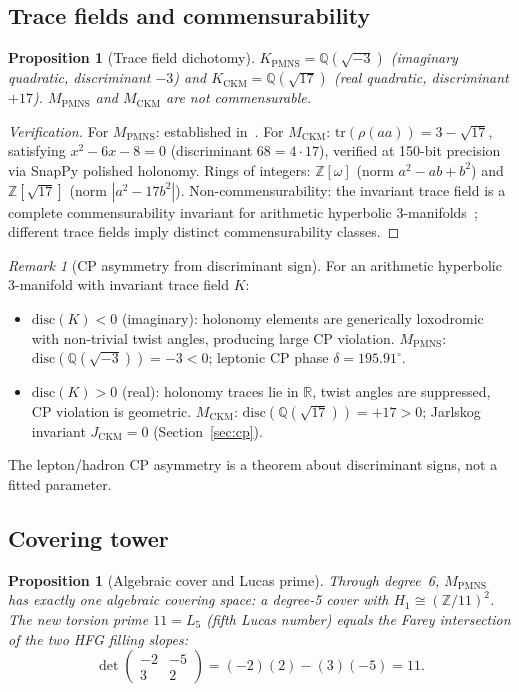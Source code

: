 \documentclass[11pt,a4paper]{article}
\newtheorem{proposition}[theorem]{Proposition}
\theoremstyle{definition}
\theoremstyle{remark}
\newtheorem{remark}[theorem]{Remark}
\newcommand{\ZZ}{\mathbb{Z}}
\newcommand{\QQ}{\mathbb{Q}}
\newcommand{\MPMNS}{M_{\mathrm{PMNS}}}
\newcommand{\MCKM}{M_{\mathrm{CKM}}}
\newcommand{\KPMNS}{K_{\mathrm{PMNS}}}
\newcommand{\KCKM}{K_{\mathrm{CKM}}}
\newcommand{\Zom}{\mathbb{Z}[\omega]}
\newcommand{\Zsev}{\mathbb{Z}[\sqrt{17}]}
\begin{document}
\subsection{Trace fields and commensurability}

\begin{proposition}[Trace field dichotomy]
\label{prop:tracefields}
$\KPMNS = \QQ(\sqrt{-3})$ (imaginary quadratic,
discriminant $-3$) and $\KCKM = \QQ(\sqrt{17})$
(real quadratic, discriminant $+17$).
$\MPMNS$ and $\MCKM$ are not commensurable.
\end{proposition}

\begin{proof}[Verification]
For $\MPMNS$: established in~\cite{Chinburg98}.
For $\MCKM$: $\mathrm{tr}(\rho(aa)) = 3-\sqrt{17}$,
satisfying $x^2-6x-8=0$ (discriminant $68=4\cdot17$),
verified at 150-bit precision via SnapPy polished holonomy.
Rings of integers: $\Zom$ (norm $a^2-ab+b^2$) and
$\Zsev$ (norm $|a^2-17b^2|$).
Non-commensurability: the invariant trace field is a complete
commensurability invariant for arithmetic hyperbolic
3-manifolds~\cite{MaclachlanReid}; different trace fields
imply distinct commensurability classes.
\end{proof}

\begin{remark}[CP asymmetry from discriminant sign]
\label{rem:cp_asym}
For an arithmetic hyperbolic 3-manifold with invariant trace field $K$:
\begin{itemize}
\item $\mathrm{disc}(K)<0$ (imaginary): holonomy elements are
  generically loxodromic with non-trivial twist angles,
  producing large CP violation.
  $\MPMNS$: $\mathrm{disc}(\QQ(\sqrt{-3}))=-3<0$;
  leptonic CP phase $\delta=195.91^\circ$.
\item $\mathrm{disc}(K)>0$ (real): holonomy traces lie in $\mathbb{R}$,
  twist angles are suppressed, CP violation is geometric.
  $\MCKM$: $\mathrm{disc}(\QQ(\sqrt{17}))=+17>0$;
  Jarlskog invariant $J_\mathrm{CKM}=0$ (Section~\ref{sec:cp}).
\end{itemize}
The lepton/hadron CP asymmetry is a theorem about discriminant signs,
not a fitted parameter.
\end{remark}

\subsection{Covering tower}

\begin{proposition}[Algebraic cover and Lucas prime]
\label{prop:cover}
Through degree~6, $\MPMNS$ has exactly one algebraic covering space:
a degree-5 cover with $H_1 \cong (\ZZ/11)^2$.
The new torsion prime $11 = L_5$ (fifth Lucas number) equals the
Farey intersection of the two HFG filling slopes:
\[
  \det\!\begin{pmatrix}-2&-5\\3&2\end{pmatrix}
  = (-2)(2)-(3)(-5) = 11.
\]
\end{proposition}
\end{document}
